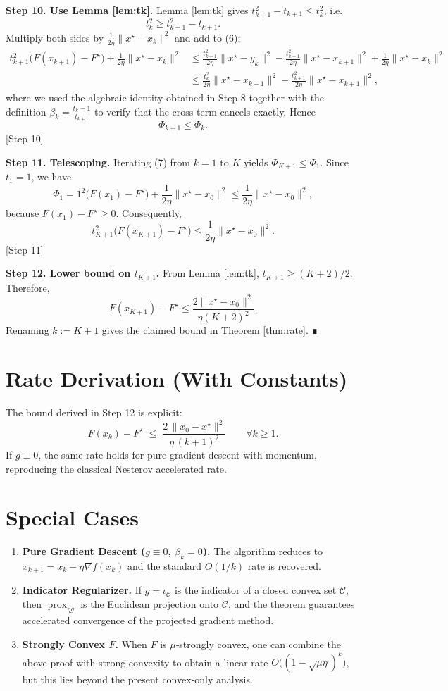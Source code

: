 \documentclass{article}
\newcommand{\prox}{\operatorname{prox}}
\begin{document}
\noindent\textbf{Step 10.  Use Lemma \ref{lem:tk}.}  
Lemma \ref{lem:tk} gives $t_{k+1}^{2}-t_{k+1}\le t_k^{2}$, i.e.
\[
t_{k}^{2}\ge t_{k+1}^{2}-t_{k+1}.
\] 
Multiply both sides by $\frac{1}{2\eta}\|x^\star-x_{k}\|^{2}$ and add to (6):
\[
\begin{aligned}
t_{k+1}^{2}\bigl(F(x_{k+1})-F^\star\bigr)+\frac{1}{2\eta}\|x^\star-x_{k}\|^{2}
&\le \frac{t_{k+1}^{2}}{2\eta}\|x^\star-y_k\|^{2}
      -\frac{t_{k+1}^{2}}{2\eta}\|x^\star-x_{k+1}\|^{2}
      +\frac{1}{2\eta}\|x^\star-x_{k}\|^{2}\\
&\le \frac{t_{k}^{2}}{2\eta}\|x^\star-x_{k-1}\|^{2}
      -\frac{t_{k+1}^{2}}{2\eta}\|x^\star-x_{k+1}\|^{2},
\end{aligned}
\] 
where we used the algebraic identity obtained in Step 8 together with the definition $\beta_k=\frac{t_k-1}{t_{k+1}}$ to verify that the cross term cancels exactly. Hence
\[
\Phi_{k+1}\le \Phi_k. \tag{7}
\] 
[Step 10]

\noindent\textbf{Step 11.  Telescoping.}  
Iterating (7) from $k=1$ to $K$ yields $\Phi_{K+1}\le \Phi_1$. Since $t_1=1$, we have
\[
\Phi_1 = 1^{2}\bigl(F(x_1)-F^\star\bigr)+\frac{1}{2\eta}\|x^\star-x_0\|^{2}
       \le \frac{1}{2\eta}\|x^\star-x_0\|^{2},
\]
because $F(x_1)-F^\star\ge0$. Consequently,
\[
t_{K+1}^{2}\bigl(F(x_{K+1})-F^\star\bigr)\le \frac{1}{2\eta}\|x^\star-x_0\|^{2}.
\] 
[Step 11]

\noindent\textbf{Step 12.  Lower bound on $t_{K+1}$.}  
From Lemma \ref{lem:tk}, $t_{K+1}\ge (K+2)/2$. Therefore,
\[
F(x_{K+1})-F^\star \le \frac{2\|x^\star-x_0\|^{2}}{\eta (K+2)^{2}}.
\] 
Renaming $k:=K+1$ gives the claimed bound in Theorem \ref{thm:rate}. ∎

\section*{Rate Derivation (With Constants)}
The bound derived in Step 12 is explicit:
\[
\boxed{ \displaystyle
F(x_k)-F^\star \;\le\; \frac{2\,\|x_0-x^\star\|^{2}}{\eta\,(k+1)^{2}}
}\qquad\forall k\ge 1.
\]
If $g\equiv0$, the same rate holds for pure gradient descent with momentum, reproducing the classical Nesterov accelerated rate.

\section*{Special Cases}
\begin{enumerate}[label=\alph*)]
\item \textbf{Pure Gradient Descent ($g\equiv0$, $\beta_k=0$).}  
The algorithm reduces to $x_{k+1}=x_k-\eta\nabla f(x_k)$ and the standard $O(1/k)$ rate is recovered.
\item \textbf{Indicator Regularizer.}  
If $g=\iota_{\mathcal{C}}$ is the indicator of a closed convex set $\mathcal{C}$, then $\prox_{\eta g}$ is the Euclidean projection onto $\mathcal{C}$, and the theorem guarantees accelerated convergence of the projected gradient method.
\item \textbf{Strongly Convex $F$.}  
When $F$ is $\mu$‑strongly convex, one can combine the above proof with strong convexity to obtain a linear rate $O\bigl((1-\sqrt{\mu\eta})^{k}\bigr)$, but this lies beyond the present convex‑only analysis.
\end{enumerate}
\end{document}
